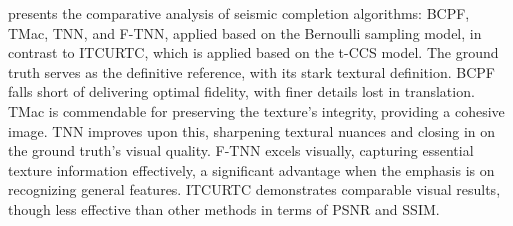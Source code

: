 \documentclass[twoside,12pt]{article}
\begin{document}
 presents the comparative analysis of seismic completion algorithms: BCPF, TMac, TNN, and F-TNN, applied based on the Bernoulli sampling model, in contrast to ITCURTC, which is applied based on the t-CCS model. The ground truth serves as the definitive reference, with its stark textural definition. BCPF falls short of delivering optimal fidelity, with finer details lost in translation. TMac is commendable for preserving the texture's integrity, providing a cohesive image. TNN improves upon this, sharpening textural nuances and closing in on the ground truth's visual quality. F-TNN excels visually, capturing essential texture information effectively, a significant advantage when the emphasis is on recognizing general features. ITCURTC demonstrates comparable visual results, though less effective than other methods in terms of PSNR and SSIM.
\end{document}
